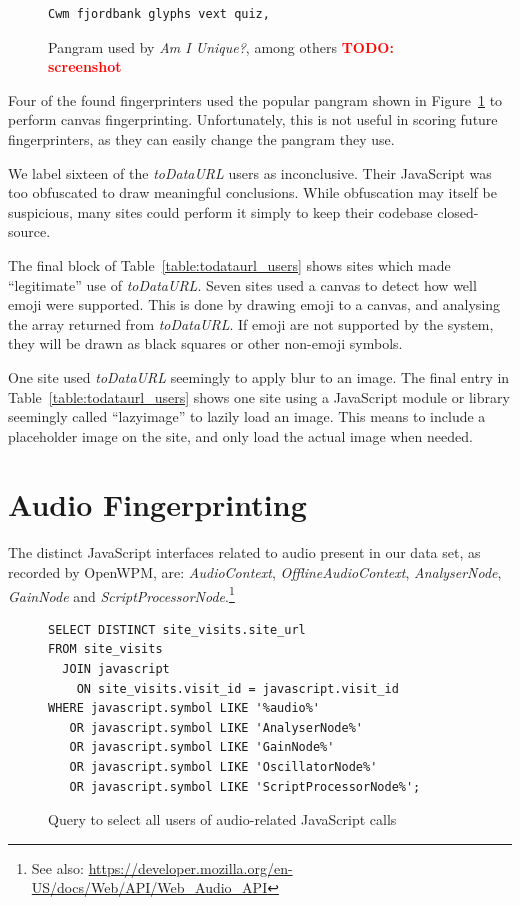 \documentclass[
    fontsize=12pt,
    headings=small,
    parskip=half,
    bibliography=totoc,
    numbers=noenddot,
    open=any
    ]{scrreprt}
\newcommand{\todo}[1]{\textcolor{red}{\textbf{TODO: #1}}}
\begin{document}
\begin{figure}
\begin{verbatim}
Cwm fjordbank glyphs vext quiz, 
\end{verbatim}
\caption{Pangram used by \textit{Am I Unique?}, among others \todo{screenshot}}
\label{code:pangram}
\end{figure}

Four of the found fingerprinters used the popular pangram shown in
Figure~\ref{code:pangram} to perform canvas fingerprinting.
Unfortunately, this is not useful in scoring future fingerprinters,
as they can easily change the pangram they use.

We label sixteen of the \textit{toDataURL} users as inconclusive.
Their JavaScript was too obfuscated to draw meaningful conclusions.
While obfuscation may itself be suspicious, many sites could perform
it simply to keep their codebase closed-source.

The final block of Table~\ref{table:todataurl_users} shows sites which
made ``legitimate'' use of \textit{toDataURL}. Seven sites used a canvas
to detect how well emoji were supported. This is done by drawing emoji
to a canvas, and analysing the array returned from \textit{toDataURL}.
If emoji are not supported by the system, they will be drawn as black
squares or other non-emoji symbols.

One site used \textit{toDataURL} seemingly to apply blur to an image.
The final entry in Table~\ref{table:todataurl_users} shows one site
using a JavaScript module or library seemingly called ``lazyimage''
to lazily load an image. This means to include a placeholder
image on the site, and only load the actual image when needed.


\section{Audio Fingerprinting}
The distinct JavaScript interfaces related to audio present in our data set,
as recorded by OpenWPM, are:
\textit{AudioContext},
\textit{OfflineAudioContext},
\textit{AnalyserNode},
\textit{GainNode} and \textit{ScriptProcessorNode}.\footnote{See also: \url{https://developer.mozilla.org/en-US/docs/Web/API/Web_Audio_API}}

\begin{figure}
\begin{verbatim}
SELECT DISTINCT site_visits.site_url
FROM site_visits
  JOIN javascript
    ON site_visits.visit_id = javascript.visit_id
WHERE javascript.symbol LIKE '%audio%'
   OR javascript.symbol LIKE 'AnalyserNode%'
   OR javascript.symbol LIKE 'GainNode%'
   OR javascript.symbol LIKE 'OscillatorNode%'
   OR javascript.symbol LIKE 'ScriptProcessorNode%';
\end{verbatim}
\caption{Query to select all users of audio-related JavaScript calls}
\label{code:audio_query}
\end{figure}
\end{document}
